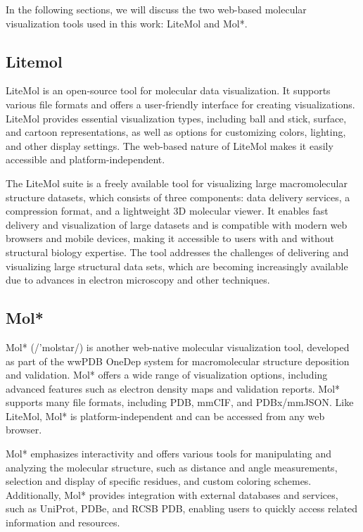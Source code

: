 \documentclass[
  digital,     %
  oneside,     %
  nosansbold,  %
  nocolorbold, %
  lof,         %
  lot,         %
]{fithesis4}
\begin{document}
In the following sections, we will discuss the two web-based molecular visualization tools used in this work: LiteMol and Mol*.

\subsection{Litemol}
\label{subsection:litemol}

LiteMol is an open-source tool for molecular data visualization. It supports various file formats and offers a user-friendly interface for creating visualizations. LiteMol provides essential visualization types, including ball and stick, surface, and cartoon representations, as well as options for customizing colors, lighting, and other display settings. The web-based nature of LiteMol makes it easily accessible and platform-independent.

The LiteMol suite is a freely available tool for visualizing large macromolecular structure datasets, which consists of three components: data delivery services, a compression format, and a lightweight 3D molecular viewer. It enables fast delivery and visualization of large datasets and is compatible with modern web browsers and mobile devices, making it accessible to users with and without structural biology expertise. The tool addresses the challenges of delivering and visualizing large structural data sets, which are becoming increasingly available due to advances in electron microscopy and other techniques. \cite{sehnal2017litemol}

\subsection{Mol*}
\label{subsection:molstar}

Mol* (/'molstar/) is another web-native molecular visualization tool, developed as part of the wwPDB OneDep system for macromolecular structure deposition and validation. Mol* offers a wide range of visualization options, including advanced features such as electron density maps and validation reports. Mol* supports many file formats, including PDB, mmCIF, and PDBx/mmJSON. Like LiteMol, Mol* is platform-independent and can be accessed from any web browser. \cite{sehnal2021molstar}

Mol* emphasizes interactivity and offers various tools for manipulating and analyzing the molecular structure, such as distance and angle measurements, selection and display of specific residues, and custom coloring schemes. Additionally, Mol* provides integration with external databases and services, such as UniProt, PDBe, and RCSB PDB, enabling users to quickly access related information and resources.
\end{document}
